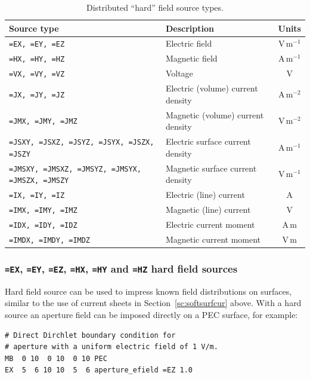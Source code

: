 \documentclass[onecolumn,a4paper]{article}
\numberwithin{equation}{section}
\begin{document}
\begin{table}[ht]
\begin{center}
\begin{tabular}{|l|l|c|}\hline
Source type                                             &Description                        &Units       \\
\hline
\texttt{=EX, =EY, =EZ}                                  &Electric field                     &V\,m$^{-1}$ \\
\texttt{=HX, =HY, =HZ}                                  &Magnetic field                     &A\,m$^{-1}$ \\
\texttt{=VX, =VY, =VZ}                                  &Voltage                            &V           \\
\texttt{=JX, =JY, =JZ}                                  &Electric (volume) current density  &A\,m$^{-2}$ \\
\texttt{=JMX, =JMY, =JMZ}                               &Magnetic (volume) current density  &V\,m$^{-2}$ \\
\texttt{=JSXY, =JSXZ, =JSYZ, =JSYX, =JSZX, =JSZY}       &Electric surface current density   &A\,m$^{-1}$ \\
\texttt{=JMSXY, =JMSXZ, =JMSYZ, =JMSYX, =JMSZX, =JMSZY} &Magnetic surface current density   &V\,m$^{-1}$ \\
\texttt{=IX, =IY, =IZ}                                  &Electric (line) current            &A           \\
\texttt{=IMX, =IMY, =IMZ}                               &Magnetic (line) current            &V           \\
\texttt{=IDX, =IDY, =IDZ}                               &Electric current moment            &A\,m        \\
\texttt{=IMDX, =IMDY, =IMDZ}                            &Magnetic current moment            &V\,m        \\
\hline
\end{tabular}
\caption{\label{tb:exhard}Distributed ``hard'' field source types.}
\end{center}
\end{table}

\subsubsection{\texttt{=EX}, \texttt{=EY}, \texttt{=EZ}, \texttt{=HX}, \texttt{=HY} and \texttt{=HZ} hard field sources}

Hard field source can be used to impress known field distributions on surfaces, similar to the use
of current sheets in Section~\ref{sc:softsurfcur} above. With a hard source an aperture field can be imposed directly
on a PEC surface, for example:
\begin{verbatim}
# Direct Dirchlet boundary condition for
# aperture with a uniform electric field of 1 V/m.
MB  0 10  0 10  0 10 PEC
EX  5  6 10 10  5  6 aperture_efield =EZ 1.0
\end{verbatim}
\end{document}
